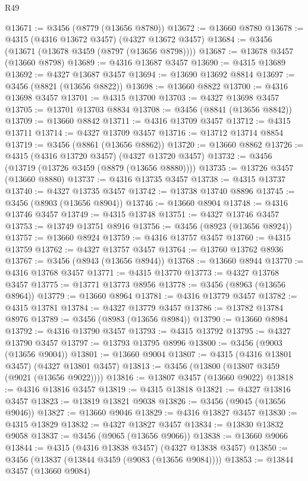 \begin{lexlean}{R49}
\begin{coremodule}
@13671 := @3456 (@8779 (@13656 @8780))
@13672 := @13660 @8780
@13678 := @4315 (@4316 @13672 @3457) (@4327 @13672 @3457)
@13684 := @3456 (@13671 (@13678 @3459 (@8797 (@13656 @8798))))
@13687 := @13678 @3457 (@13660 @8798)
@13689 := @4316 @13687 @3457
@13690 := @4315 @13689
@13692 := @4327 @13687 @3457
@13694 := @13690 @13692 @8814
@13697 := @3456 (@8821 (@13656 @8822))
@13698 := @13660 @8822
@13700 := @4316 @13698 @3457
@13701 := @4315 @13700
@13703 := @4327 @13698 @3457
@13705 := @13701 @13703 @8834
@13708 := @3456 (@8841 (@13656 @8842))
@13709 := @13660 @8842
@13711 := @4316 @13709 @3457
@13712 := @4315 @13711
@13714 := @4327 @13709 @3457
@13716 := @13712 @13714 @8854
@13719 := @3456 (@8861 (@13656 @8862))
@13720 := @13660 @8862
@13726 := @4315 (@4316 @13720 @3457) (@4327 @13720 @3457)
@13732 := @3456 (@13719 (@13726 @3459 (@8879 (@13656 @8880))))
@13735 := @13726 @3457 (@13660 @8880)
@13737 := @4316 @13735 @3457
@13738 := @4315 @13737
@13740 := @4327 @13735 @3457
@13742 := @13738 @13740 @8896
@13745 := @3456 (@8903 (@13656 @8904))
@13746 := @13660 @8904
@13748 := @4316 @13746 @3457
@13749 := @4315 @13748
@13751 := @4327 @13746 @3457
@13753 := @13749 @13751 @8916
@13756 := @3456 (@8923 (@13656 @8924))
@13757 := @13660 @8924
@13759 := @4316 @13757 @3457
@13760 := @4315 @13759
@13762 := @4327 @13757 @3457
@13764 := @13760 @13762 @8936
@13767 := @3456 (@8943 (@13656 @8944))
@13768 := @13660 @8944
@13770 := @4316 @13768 @3457
@13771 := @4315 @13770
@13773 := @4327 @13768 @3457
@13775 := @13771 @13773 @8956
@13778 := @3456 (@8963 (@13656 @8964))
@13779 := @13660 @8964
@13781 := @4316 @13779 @3457
@13782 := @4315 @13781
@13784 := @4327 @13779 @3457
@13786 := @13782 @13784 @8976
@13789 := @3456 (@8983 (@13656 @8984))
@13790 := @13660 @8984
@13792 := @4316 @13790 @3457
@13793 := @4315 @13792
@13795 := @4327 @13790 @3457
@13797 := @13793 @13795 @8996
@13800 := @3456 (@9003 (@13656 @9004))
@13801 := @13660 @9004
@13807 := @4315 (@4316 @13801 @3457) (@4327 @13801 @3457)
@13813 := @3456 (@13800 (@13807 @3459 (@9021 (@13656 @9022))))
@13816 := @13807 @3457 (@13660 @9022)
@13818 := @4316 @13816 @3457
@13819 := @4315 @13818
@13821 := @4327 @13816 @3457
@13823 := @13819 @13821 @9038
@13826 := @3456 (@9045 (@13656 @9046))
@13827 := @13660 @9046
@13829 := @4316 @13827 @3457
@13830 := @4315 @13829
@13832 := @4327 @13827 @3457
@13834 := @13830 @13832 @9058
@13837 := @3456 (@9065 (@13656 @9066))
@13838 := @13660 @9066
@13844 := @4315 (@4316 @13838 @3457) (@4327 @13838 @3457)
@13850 := @3456 (@13837 (@13844 @3459 (@9083 (@13656 @9084))))
@13853 := @13844 @3457 (@13660 @9084)

\end{coremodule}
\end{lexlean}

